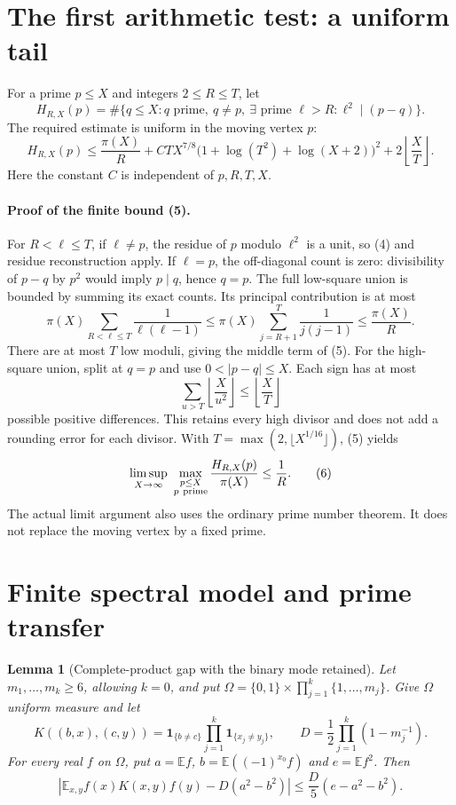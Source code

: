\documentclass[11pt]{article}
\newtheorem{lemma}{Lemma}
\newcommand{\E}{\mathbb E}
\begin{document}
\section{The first arithmetic test: a uniform tail}

For a prime \(p\le X\) and integers \(2\le R\le T\), let
\[
 H_{R,X}(p)=\#\{q\le X:q\text{ prime},\ q\ne p,\
        \exists\text{ prime }\ell>R:\ell^2\mid(p-q)\}.
\]
The required estimate is uniform in the moving vertex \(p\):
\[
 H_{R,X}(p)\le
 \frac{\pi(X)}R+
 C T X^{7/8}\bigl(1+\log(T^2)+\log(X+2)\bigr)^2+
 2\left\lfloor\frac XT\right\rfloor .                \tag{5}
\]
Here the constant \(C\) is independent of \(p,R,T,X\).

\paragraph{Proof of the finite bound (5).}
For \(R<\ell\le T\), if \(\ell\ne p\), the residue of \(p\) modulo
\(\ell^2\) is a unit, so (4) and residue reconstruction apply.
If \(\ell=p\), the off-diagonal count is zero: divisibility of \(p-q\)
by \(p^2\) would imply \(p\mid q\), hence \(q=p\).
The full low-square union is bounded by summing its exact counts.
Its principal contribution is at most
\[
 \pi(X)\sum_{R<\ell\le T}\frac1{\ell(\ell-1)}
 \le \pi(X)\sum_{j=R+1}^{T}\frac1{j(j-1)}
 \le \frac{\pi(X)}R .
\]
There are at most \(T\) low moduli, giving the middle term of (5).
For the high-square union, split at \(q=p\) and use
\(0<|p-q|\le X\). Each sign has at most
\[
 \sum_{u>T}\left\lfloor\frac X{u^2}\right\rfloor
 \le\left\lfloor\frac XT\right\rfloor
\]
possible positive differences. This retains every high divisor and
does not add a rounding error for each divisor.
With \(T=\max(2,\lfloor X^{1/16}\rfloor)\), (5) yields
\[
 \limsup_{X\to\infty}\ \max_{\substack{p\le X\\p\ {\rm prime}}}
       \frac{H_{R,X}(p)}{\pi(X)}\le\frac1R .         \tag{6}
\]
The actual limit argument also uses the ordinary prime number theorem.
It does not replace the moving vertex by a fixed prime.

\section{Finite spectral model and prime transfer}

\begin{lemma}[Complete-product gap with the binary mode retained]\label{lem:finite}
Let \(m_1,\ldots,m_k\ge6\), allowing \(k=0\), and put
\(\Omega=\{0,1\}\times\prod_{j=1}^k\{1,\ldots,m_j\}\).
Give \(\Omega\) uniform measure and let
\[
 K((b,x),(c,y))=\mathbf1_{\{b\ne c\}}
                   \prod_{j=1}^k\mathbf1_{\{x_j\ne y_j\}},\qquad
 D=\frac12\prod_{j=1}^k(1-m_j^{-1}).
\]
For every real \(f\) on \(\Omega\), put
\(a=\E f\), \(b=\E((-1)^{x_0}f)\) and \(e=\E f^2\). Then
\[
 \left|\E_{x,y} f(x)K(x,y)f(y)-D(a^2-b^2)\right|
       \le \frac D5(e-a^2-b^2).
\]
\end{lemma}
\end{document}
